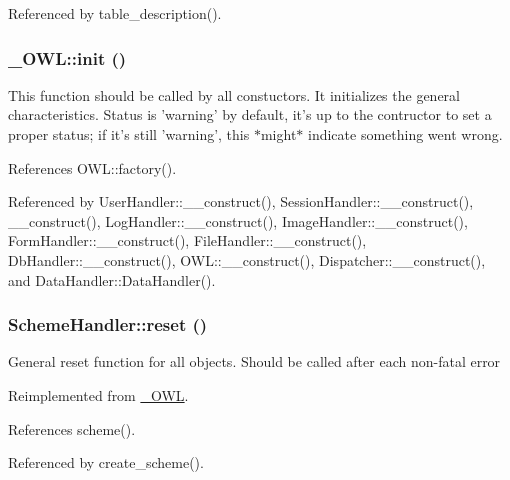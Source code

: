 Referenced by table\_\-description().

\subsubsection[{init}]{\setlength{\rightskip}{0pt plus 5cm}\_\-OWL::init ()}\label{class__OWL_ae0ef3ded56e8a6b34b6461e5a721cd3e}
This function should be called by all constuctors. It initializes the general characteristics. Status is 'warning' by default, it's up to the contructor to set a proper status; if it's still 'warning', this $\ast$might$\ast$ indicate something went wrong. 

References OWL::factory().



Referenced by UserHandler::\_\-\_\-construct(), SessionHandler::\_\-\_\-construct(), \_\-\_\-construct(), LogHandler::\_\-\_\-construct(), ImageHandler::\_\-\_\-construct(), FormHandler::\_\-\_\-construct(), FileHandler::\_\-\_\-construct(), DbHandler::\_\-\_\-construct(), OWL::\_\-\_\-construct(), Dispatcher::\_\-\_\-construct(), and DataHandler::DataHandler().

\subsubsection[{reset}]{\setlength{\rightskip}{0pt plus 5cm}SchemeHandler::reset ()}\label{classSchemeHandler_aa25feb4a70d67b3d571904be4b2f50bc}
General reset function for all objects. Should be called after each non-\/fatal error 

Reimplemented from \hyperlink{class__OWL_a2f2a042bcf31965194c03033df0edc9b}{\_\-OWL}.



References scheme().



Referenced by create\_\-scheme().

